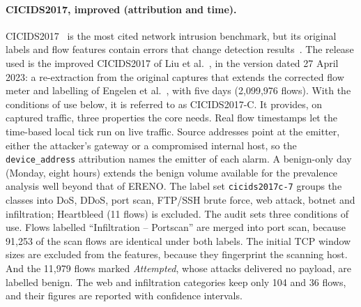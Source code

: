 \paragraph{CICIDS2017, improved (attribution and time).}
CICIDS2017~\cite{sharafaldin2018toward} is the most cited network intrusion benchmark,
but its original labels and flow features contain errors that change detection
results~\cite{engelen2021troubleshooting,lanvin2023errors,liu2022error}. The release used
is the improved CICIDS2017 of Liu et al.~\cite{liu2022error}, in the version dated 27 April 2023: a
re-extraction from the original captures that extends the corrected flow meter and
labelling of Engelen et al.~\cite{engelen2021troubleshooting}, with five days
(2{,}099{,}976 flows). With the conditions of use below, it is referred to as
CICIDS2017-C. It provides, on captured traffic, three
properties the core needs. Real flow timestamps let the time-based local tick run on live
traffic. Source addresses point at the emitter, either the attacker's gateway or a
compromised internal host, so the \texttt{device\_address} attribution names the emitter of
each alarm. A benign-only day (Monday, eight hours)
extends the benign volume available for the prevalence analysis well beyond that of
ERENO. The label set \texttt{cicids2017c-7} groups the classes into DoS, DDoS, port scan,
FTP/SSH brute force, web attack, botnet and infiltration; Heartbleed (11 flows) is
excluded. The audit sets three conditions of use. Flows labelled ``Infiltration --
Portscan'' are merged into port scan, because 91{,}253 of the scan flows are identical
under both labels. The initial TCP window sizes are excluded from the features, because
they fingerprint the scanning host. And the 11{,}979 flows marked \emph{Attempted}, whose
attacks delivered no payload, are labelled benign. The web and infiltration categories
keep only 104 and 36 flows, and their figures are reported with confidence intervals.

